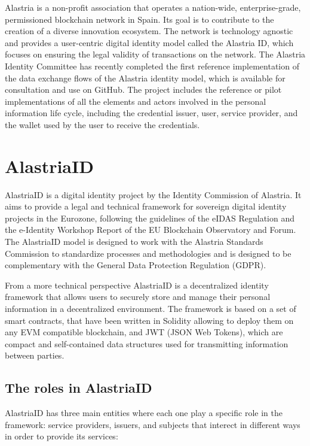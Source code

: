 \documentclass[target=mst,aauheader=]{thud}
\begin{document}
Alastria is a non-profit association that operates a nation-wide, enterprise-grade, permissioned blockchain network in Spain. Its goal is to contribute to the creation of a diverse innovation ecosystem. The network is technology agnostic and provides a user-centric digital identity model called the Alastria ID, which focuses on ensuring the legal validity of transactions on the network. The Alastria Identity Committee has recently completed the first reference implementation of the data exchange flows of the Alastria identity model, which is available for consultation and use on GitHub. The project includes the reference or pilot implementations of all the elements and actors involved in the personal information life cycle, including the credential issuer, user, service provider, and the wallet used by the user to receive the credentials.

\section{AlastriaID}

AlastriaID is a digital identity project by the Identity Commission of Alastria. It aims to provide a legal and technical framework for sovereign digital identity projects in the Eurozone, following the guidelines of the eIDAS Regulation and the e-Identity Workshop Report of the EU Blockchain Observatory and Forum. The AlastriaID model is designed to work with the Alastria Standards Commission to standardize processes and methodologies and is designed to be complementary with the General Data Protection Regulation (GDPR).

From a more technical perspective AlastriaID is a decentralized identity framework that allows users to securely store and manage their personal information in a decentralized environment. The framework is based on a set of smart contracts, that have been written in Solidity allowing to deploy them on any EVM compatible blockchain, and JWT (JSON Web Tokens), which are compact and self-contained data structures used for transmitting information between parties. 

\subsection{The roles in AlastriaID}

AlastriaID has three main entities where each one play a specific role in the framework: service providers, issuers, and subjects that interect in different ways in order to provide its services:
\end{document}
